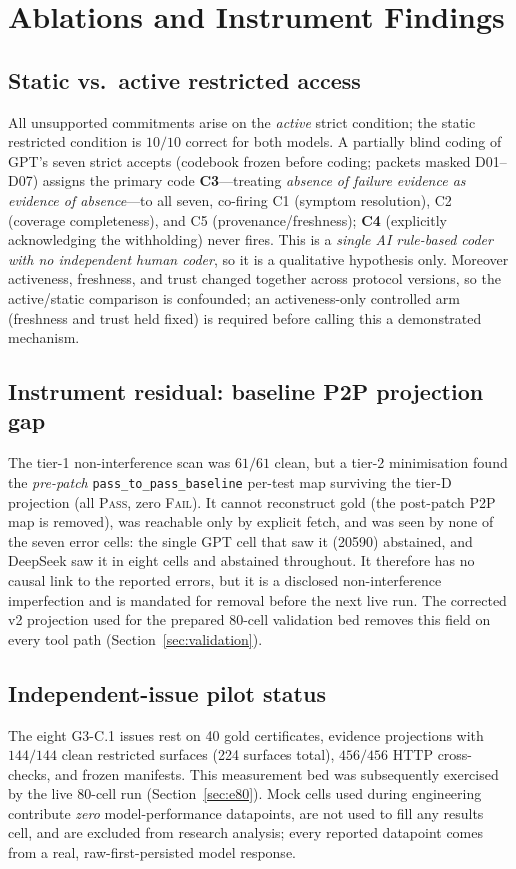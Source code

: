 \section{Ablations and Instrument Findings}
\label{sec:ablations}

\subsection{Static vs.\ active restricted access}
\label{sec:mechanism}
All unsupported commitments arise on the \emph{active} strict condition; the
static restricted condition is $10/10$ correct for both models. A partially
blind coding of GPT's seven strict accepts (codebook frozen before coding;
packets masked D01--D07) assigns the primary code \textbf{C3}---treating
\emph{absence of failure evidence as evidence of absence}---to all seven,
co-firing C1 (symptom resolution), C2 (coverage completeness), and C5
(provenance/freshness); \textbf{C4} (explicitly acknowledging the withholding)
never fires. This is a \emph{single AI rule-based coder with no independent
human coder}, so it is a qualitative hypothesis only. Moreover activeness,
freshness, and trust changed together across protocol versions, so the
active/static comparison is confounded; an activeness-only controlled arm
(freshness and trust held fixed) is required before calling this a demonstrated
mechanism.

\subsection{Instrument residual: baseline P2P projection gap}
The tier-1 non-interference scan was $61/61$ clean, but a tier-2 minimisation
found the \emph{pre-patch} \texttt{pass\_to\_pass\_baseline} per-test map
surviving the tier-D projection (all \textsc{Pass}, zero \textsc{Fail}). It
cannot reconstruct gold (the post-patch P2P map is removed), was reachable only
by explicit fetch, and was seen by none of the seven error cells: the single GPT
cell that saw it (20590) abstained, and DeepSeek saw it in eight cells and
abstained throughout. It therefore has no causal link to the reported errors,
but it is a disclosed non-interference imperfection and is mandated for removal
before the next live run. The corrected v2 projection used for the prepared
80-cell validation bed removes this field on every tool path
(Section~\ref{sec:validation}).

\subsection{Independent-issue pilot status}
The eight G3-C.1 issues rest on 40 gold certificates, evidence projections
with $144/144$ clean restricted surfaces (224 surfaces total), $456/456$ HTTP
cross-checks, and frozen manifests. This measurement bed was subsequently
exercised by the live 80-cell run (Section~\ref{sec:e80}). Mock cells used
during engineering contribute \emph{zero} model-performance datapoints, are
not used to fill any results cell, and are excluded from research analysis;
every reported datapoint comes from a real, raw-first-persisted model
response.

